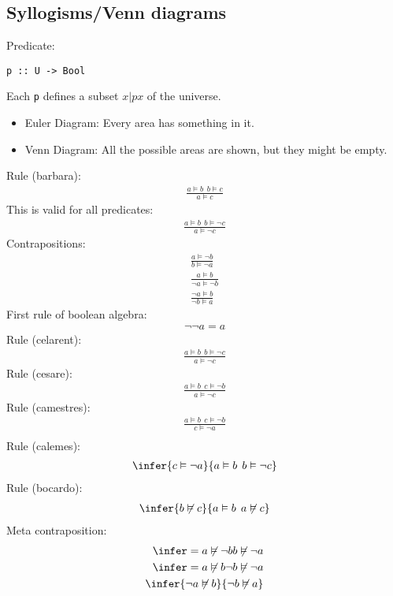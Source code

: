 \documentclass{article}
\begin{document}
\subsection{Syllogisms/Venn diagrams}
Predicate:
\begin{verbatim}
p :: U -> Bool
\end{verbatim}
Each \texttt{p} defines a subset ${ x | p x }$ of the universe.\\
\begin{itemize}
    \item Euler Diagram: Every area has something in it.
    \item Venn Diagram: All the possible areas are shown, but they might be empty.
\end{itemize}
Rule (barbara):
\begin{align}
    \frac{a \vDash b\:\: b \vDash c}{a \vDash c}
\end{align}
This is valid for all predicates:
\begin{align}
    \frac{a \vDash b\:\: b \vDash \neg c}{a \vDash \neg c}
\end{align}
Contrapositions:
\begin{align}
    \frac{a \vDash \neg b}{b \vDash \neg a}\\
    \frac{a \vDash b}{\neg a \vDash \neg b}\\
    \frac{\neg a \vDash b}{\neg b \vDash a}
\end{align}
First rule of boolean algebra:
\begin{align}
    \neg \neg a = a
\end{align}
Rule (celarent):
\begin{align}
    \frac{a \vDash b \:\: b \vDash \neg c}{a \vDash \neg c}
\end{align}
Rule (cesare):
\begin{align}
    \frac{a \vDash b \:\: c \vDash \neg b}{a \vDash \neg c}
\end{align}
Rule (camestres):
\begin{align}
    \frac{a\vDash b \:\: c\vDash \neg b}{c \vDash \neg a}\\
\end{align}
Rule (calemes):
\begin{align}
    \infer{c \vDash \neg a}{a\vDash b \:\: b\vDash \neg c}
\end{align}
Rule (bocardo):
\begin{align}
    \infer{b \not\vDash c}{a\vDash b\:\:a\not\vDash c}
\end{align}
Meta contraposition:
\begin{align}
    \infer={
        a\not\vDash \neg b
    }{
        b\not\vDash \neg a
    }\\
    \infer={a\not\vDash b}{\neg b \not\vDash \neg a}\\
    \infer{\neg a \not\vDash b}{\neg b \not\vDash a}
\end{align}
\end{document}
